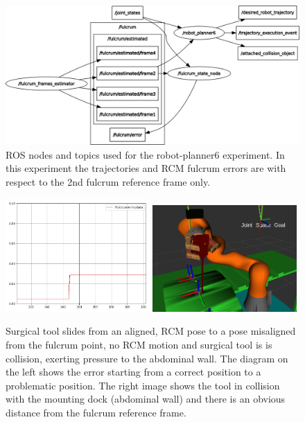 \begin{center}
\begin{figure}[!htb]
\centering
\includegraphics[width=\textwidth]{images/robot_planner6/topics-and-nodes.png}
\caption{ROS nodes and topics used for the robot-planner6 experiment. In this experiment the trajectories and RCM fulcrum errors are with respect to the 2nd fulcrum reference frame only.}
\end{figure}
\end{center}

\begin{center}
\begin{figure}[!htb]
\centering
\includegraphics[width=0.49\textwidth]{images/robot_planner6/rcm-error-collision.png}
\includegraphics[width=0.49\textwidth]{images/robot_planner6/rcm-collision.png}\\
\caption{Surgical tool slides from an aligned, RCM pose to a pose misaligned from the fulcrum point, no RCM motion and surgical tool is is collision, exerting pressure to the abdominal wall. The diagram on the 
left shows the error starting from a correct position to a problematic position. The right image shows the tool in collision with the mounting dock (abdominal wall) and there is an obvious distance from the 
fulcrum reference frame.}
\end{figure}
\end{center}


